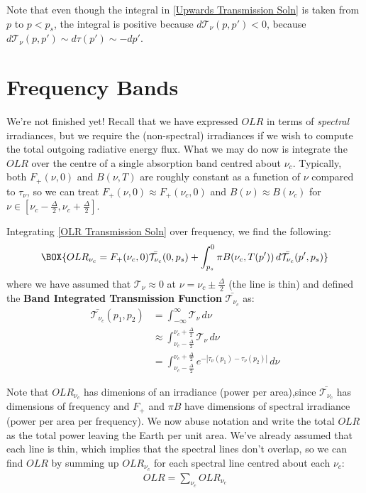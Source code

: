 Note that even though the integral in \ref{Upwards Transmission Soln} is taken from $p$ to $p<p_s$, the integral is positive because $d\mathcal{T}_\nu(p,p')<0$, because $d\mathcal{T}_\nu(p,p')\sim d\tau(p')\sim - dp'$.

\section{Frequency Bands}\label{Frequency Bands}

We're not finished yet! Recall that we have expressed $OLR$ in terms of \textit{spectral} irradiances, but we require the (non-spectral) irradiances if we wish to compute the total outgoing radiative energy flux. What we may do now is integrate the $OLR$ over the centre of a single absorption band centred about $\nu_c$. Typically, both $F_+(\nu,0)$ and $B(\nu,T)$ are roughly constant as a function of $\nu$ compared to $\tau_\nu$, so we can treat $F_+(\nu,0)\approx F_+(\nu_c,0)$ and $B(\nu)\approx B(\nu_c)$ for $\nu\in[\nu_c-\frac{\Delta}{2},\nu_c+\frac{\Delta}{2}]$.

Integrating \ref{OLR Transmission Soln} over frequency, we find the following:
\begin{align}
    \BOX{OLR_{\nu_c}
    =
    F_+(\nu_c,0)\bar{\mathcal{T}_{\nu_c}}(0,p_s)
    +
    \int_{p_s}^{0}\pi B(\nu_c,T(p'))\,d\bar{\mathcal{T}_{\nu_c}}(p',p_s)} \label{OLR Transmission Band Soln}
\end{align}
where we have assumed that $\mathcal{T}_{\nu}\approx 0$ at $\nu=\nu_c\pm\frac{\Delta}{2}$ (the line is thin) and defined the \textbf{Band Integrated Transmission Function} $\bar{\mathcal{T}_{\nu_c}}$ as:
\begin{align}\label{Transmission Function Band}
    \bar{\mathcal{T}_{\nu_c}}(p_1,p_2)&=\int_{-\infty}^{\infty}{\mathcal{T}_{\nu}}\,d\nu\\
    &\approx\int_{\nu_c-\frac{\Delta}{2}}^{\nu_c+\frac{\Delta}{2}}{\mathcal{T}_{\nu}}\,d\nu
    \\
    &=\int_{\nu_c-\frac{\Delta}{2}}^{\nu_c+\frac{\Delta}{2}} e^{-|\tau_\nu(p_1)-\tau_\nu(p_2)|}\,d\nu
\end{align}

\noindent Note that $OLR_{\nu_c}$ has dimenions of an irradiance (power per area),since $\bar{\mathcal{T}_{\nu_c}}$ has dimensions of frequency and $F_+$ and $\pi B$ have dimensions of spectral irradiance (power per area per frequency). We now abuse notation and write the total $OLR$ as the total power leaving the Earth per unit area. We've already assumed that each line is thin, which implies that the spectral lines don't overlap, so we can find $OLR$ by summing up $OLR_{\nu_c}$ for each spectral line centred about each $\nu_c$:
\begin{align*}
    OLR = \sum_{\nu_c} OLR_{\nu_c}
\end{align*}

